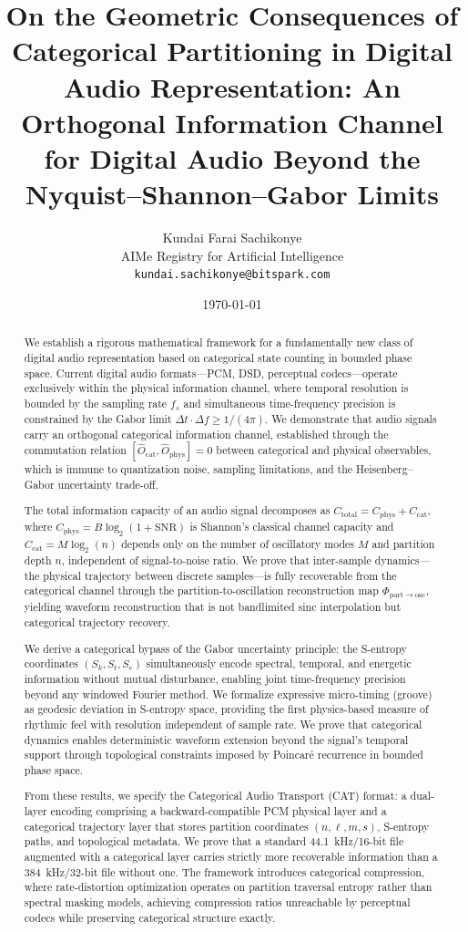 \documentclass[twocolumn,10pt]{article}
\title{On the Geometric Consequences of Categorical Partitioning in Digital Audio Representation: An Orthogonal Information Channel for Digital Audio Beyond the Nyquist--Shannon--Gabor Limits}
\author{
Kundai Farai Sachikonye\\
AIMe Registry for Artificial Intelligence\\
\texttt{kundai.sachikonye@bitspark.com}
}
\date{\today}
\theoremstyle{remark}
\newcommand{\Sk}{S_k}
\newcommand{\St}{S_t}
\newcommand{\Se}{S_e}
\newcommand{\Ocat}{\hat{O}_{\mathrm{cat}}}
\newcommand{\Ophys}{\hat{O}_{\mathrm{phys}}}
\newcommand{\Ccat}{C_{\mathrm{cat}}}
\newcommand{\Cphys}{C_{\mathrm{phys}}}
\begin{document}
\maketitle

\begin{abstract}
We establish a rigorous mathematical framework for a fundamentally new class of digital audio representation based on categorical state counting in bounded phase space. Current digital audio formats---PCM, DSD, perceptual codecs---operate exclusively within the physical information channel, where temporal resolution is bounded by the sampling rate $f_s$ and simultaneous time-frequency precision is constrained by the Gabor limit $\Delta t \cdot \Delta f \geq 1/(4\pi)$. We demonstrate that audio signals carry an orthogonal categorical information channel, established through the commutation relation $[\Ocat, \Ophys] = 0$ between categorical and physical observables, which is immune to quantization noise, sampling limitations, and the Heisenberg--Gabor uncertainty trade-off.

The total information capacity of an audio signal decomposes as $C_{\mathrm{total}} = \Cphys + \Ccat$, where $\Cphys = B\log_2(1 + \mathrm{SNR})$ is Shannon's classical channel capacity and $\Ccat = M\log_2(n)$ depends only on the number of oscillatory modes $M$ and partition depth $n$, independent of signal-to-noise ratio. We prove that inter-sample dynamics---the physical trajectory between discrete samples---is fully recoverable from the categorical channel through the partition-to-oscillation reconstruction map $\Phi_{\mathrm{part} \to \mathrm{osc}}$, yielding waveform reconstruction that is not bandlimited sinc interpolation but categorical trajectory recovery.

We derive a categorical bypass of the Gabor uncertainty principle: the S-entropy coordinates $(\Sk, \St, \Se)$ simultaneously encode spectral, temporal, and energetic information without mutual disturbance, enabling joint time-frequency precision beyond any windowed Fourier method. We formalize expressive micro-timing (groove) as geodesic deviation in S-entropy space, providing the first physics-based measure of rhythmic feel with resolution independent of sample rate. We prove that categorical dynamics enables deterministic waveform extension beyond the signal's temporal support through topological constraints imposed by Poincar\'{e} recurrence in bounded phase space.

From these results, we specify the Categorical Audio Transport (CAT) format: a dual-layer encoding comprising a backward-compatible PCM physical layer and a categorical trajectory layer that stores partition coordinates $(n, \ell, m, s)$, S-entropy paths, and topological metadata. We prove that a standard 44.1~kHz/16-bit file augmented with a categorical layer carries strictly more recoverable information than a 384~kHz/32-bit file without one. The framework introduces categorical compression, where rate-distortion optimization operates on partition traversal entropy rather than spectral masking models, achieving compression ratios unreachable by perceptual codecs while preserving categorical structure exactly.


\end{abstract}
\end{document}
